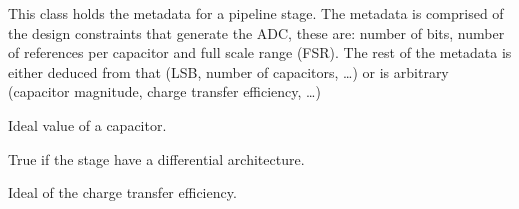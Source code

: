 \documentclass[letterpaper,10pt,english]{sphinxmanual}
\begin{document}

\begin{fulllineitems}
\label{\detokenize{gen:calib.gen.StageMeta}}
This class holds the metadata for a pipeline stage. The metadata is
comprised of the design constraints that generate the ADC, these are:
number of bits, number of references per capacitor and full scale range
(FSR). The rest of the metadata is either deduced from that (LSB, number
of capacitors, …) or is arbitrary (capacitor magnitude, charge transfer
efficiency, …)

\begin{fulllineitems}
\label{\detokenize{gen:calib.gen.StageMeta.cap}}
Ideal value of a capacitor.

\end{fulllineitems}


\begin{fulllineitems}
\label{\detokenize{gen:calib.gen.StageMeta.differential}}
True if the stage have a differential architecture.

\end{fulllineitems}


\begin{fulllineitems}
\label{\detokenize{gen:calib.gen.StageMeta.eff}}
Ideal of the charge transfer efficiency.

\end{fulllineitems}



\end{fulllineitems}
\end{document}
